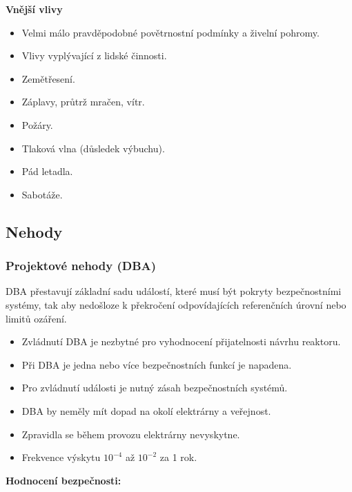 \textbf{Vnější vlivy}

\begin{itemize}
    \item Velmi málo pravděpodobné povětrnostní podmínky a živelní pohromy.
    \item Vlivy vyplývající z lidské činnosti.
    \item Zemětřesení.
    \item Záplavy, průtrž mračen, vítr.
    \item Požáry.
    \item Tlaková vlna (důsledek výbuchu).
    \item Pád letadla.
    \item Sabotáže.
\end{itemize}

\subsection{Nehody}

\subsubsection{Projektové nehody (DBA)}

DBA přestavují základní sadu událostí, které musí být pokryty bezpečnostními systémy, tak aby nedošloze k překročení odpovídajících referenčních úrovní nebo limitů ozáření.

\begin{itemize}
    \item Zvládnutí DBA je nezbytné pro vyhodnocení přijatelnosti návrhu reaktoru.
    \item Při DBA je jedna nebo více bezpečnostních funkcí je napadena.
    \item Pro zvládnutí události je nutný zásah bezpečnostních systémů.
    \item DBA by neměly mít dopad na okolí elektrárny a veřejnost.
    \item Zpravidla se během provozu elektrárny nevyskytne.
    \item Frekvence výskytu $10^{-4}$ až $10^{-2}$ za 1 rok.
\end{itemize}

\textbf{Hodnocení bezpečnosti:}

